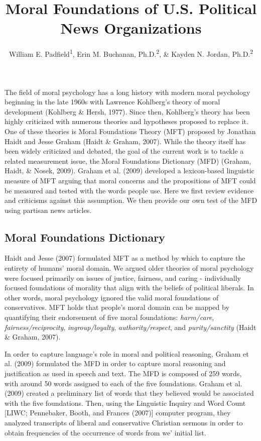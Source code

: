 \documentclass[
  man,floatsintext]{apa6}
\title{Moral Foundations of U.S. Political News Organizations}
\author{William E. Padfield\textsuperscript{1}, Erin M. Buchanan, Ph.D.\textsuperscript{2}, \& Kayden N. Jordan, Ph.D.\textsuperscript{2}}
\date{}
\affiliation{\vspace{0.5cm}\textsuperscript{1} Missouri State University\\\textsuperscript{2} Harrisburg University of Science and Technology}
\begin{document}
\maketitle

The field of moral psychology has a long history with modern moral psychology beginning in the late 1960s with Lawrence Kohlberg's theory of moral development (Kohlberg \& Hersh, 1977). Since then, Kohlberg's theory has been highly criticized with numerous theories and hypotheses proposed to replace it. One of these theories is Moral Foundations Theory (MFT) proposed by Jonathan Haidt and Jesse Graham (Haidt \& Graham, 2007). While the theory itself has been widely criticized and debated, the goal of the current work is to tackle a related measurement issue, the Moral Foundations Dictionary (MFD) (Graham, Haidt, \& Nosek, 2009). Graham et al. (2009) developed a lexicon-based linguistic measure of MFT arguing that moral concerns and the propositions of MFT could be measured and tested with the words people use. Here we first review evidence and criticisms against this assumption. We then provide our own test of the MFD using partisan news articles.

\hypertarget{moral-foundations-dictionary}{%
\subsection{Moral Foundations Dictionary}\label{moral-foundations-dictionary}}

Haidt and Jesse (2007) formulated MFT as a method by which to capture the entirety of humans' moral domain. We argued older theories of moral psychology were focused primarily on issues of justice, fairness, and caring - individually focused foundations of morality that align with the beliefs of political liberals. In other words, moral psychology ignored the valid moral foundations of conservatives. MFT holds that people's moral domain can be mapped by quantifying their endorsement of five moral foundations: \emph{harm/care}, \emph{fairness/reciprocity}, \emph{ingroup/loyalty}, \emph{authority/respect}, and \emph{purity/sanctity} (Haidt \& Graham, 2007).

In order to capture language's role in moral and political reasoning, Graham et al. (2009) formulated the MFD in order to capture moral reasoning and justification as used in speech and text. The MFD is composed of 259 words, with around 50 words assigned to each of the five foundations. Graham et al. (2009) created a preliminary list of words that they believed would be associated with the five foundations. Then, using the Linguistic Inquiry and Word Count {[}LIWC; Pennebaker, Booth, and Frances (2007){]} computer program, they analyzed transcripts of liberal and conservative Christian sermons in order to obtain frequencies of the occurrence of words from we' initial list.
\end{document}
